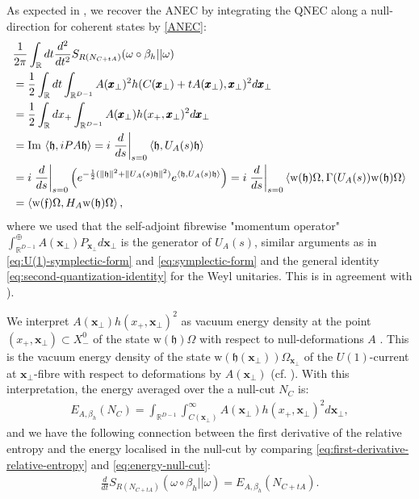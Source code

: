 \documentclass[12pt]{article}
\def\RR{{\mathbb R}}
\def\b{\beta}
\def\im{\mathrm{Im}\,}
\def\tx{\pmb{x}}
\newcommand{\norm}[1]{\left\lVert#1\right\rVert}
\theoremstyle{remark}
\begin{document}
As expected in \cite{BFKLW16}, we recover the ANEC by integrating the QNEC along a null-direction for coherent states by \eqref{ANEC}: 
	\begin{align*}
		&\frac{1}{2\pi}\int_\RR dt\frac{d^2}{dt^2}S_{R(N_{C+tA})} (\omega\circ\beta_h||\omega) \\
		&=\frac{1}{2}\int_\RR dt \int_{\RR^{D-1}}A(\tx_\perp)^2h(C(\tx_\perp)+tA(\tx_\perp),\tx_\perp)^2d\tx_\perp\\
		&=\frac{1}{2}\int_\RR dx_+ \int_{\RR^{D-1}}A(\tx_\perp)h(x_+,\tx_\perp)^2d\tx_\perp\\
	&=\im\braket{\mathfrak{h},iPA\mathfrak{h}} = i \left.\frac{d}{ds}\right|_{s=0}\braket{\mathfrak h,U_A(s)\mathfrak h} \\
	&=i\left.\frac{d}{ds}\right|_{s=0}\left(e^{-\frac{1}{2}(\norm{\mathfrak h}^2+\norm{U_A(s)\mathfrak h}^2)} e^{\braket{\mathfrak h,U_A(s)\mathfrak h}} \right)
	= i\left.\frac{d}{ds}\right|_{s=0}\braket{\mathrm w(\mathfrak h)\Omega,\Gamma(U_A(s))\mathrm w(\mathfrak h)\Omega } \\
		&=\braket{\mathrm w(\mathfrak{f})\Omega,H_A\mathrm w(\mathfrak{h})\Omega},
	\end{align*}
where we used that the self-adjoint fibrewise "momentum operator" $\int_{\RR^{D-1}}^\oplus A(\tx_\perp)P_{\tx_\perp}d\tx_\perp$ is the generator of $U_A(s)$,
similar arguments as in \eqref{eq:U(1)-symplectic-form} and \eqref{eq:symplectic-form} and the general identity \eqref{eq:second-quantization-identity} for the Weyl unitaries.
This is in agreement with \cite[Corollary 3.10 and (46)]{LongoLocalised}).

We interpret $A(\tx_\perp)h(x_+,\tx_\perp)^2$ as vacuum energy density at the point $(x_+,\tx_\perp) \subset X_-^0$ of the state $\mathrm w(\mathfrak h) \Omega$ with respect to null-deformations $A$ . This is the vacuum energy density of the state $\mathrm w(\mathfrak h(\tx_\perp))\Omega_{\tx_\perp}$ of the $U(1)$-current at $\tx_\perp$-fibre with respect to deformations by $A(\tx_\perp)$ (cf. \cite{LongoLocalised}).
With this interpretation, the energy averaged over the a null-cut $N_C$ is:
	\begin{align}
		E_{A,\b_h}( N_C)=\int_{\RR^{D-1}}\int_{C(\tx_\perp)}^\infty A(\tx_\perp)h(x_+,\tx_\perp)^2d\tx_\perp\label{eq:energy-null-cut},
	\end{align}
and we have the following connection between the first derivative of the relative entropy and the energy localised in the null-cut by comparing \eqref{eq:first-derivative-relative-entropy} and \eqref{eq:energy-null-cut}:
	\begin{align*}
		\frac{d}{dt}S_{R(N_{C+tA})}(\omega\circ\beta_h||\omega)=E_{A,\b_h}(N_{C+tA}).
	\end{align*}
\end{document}
